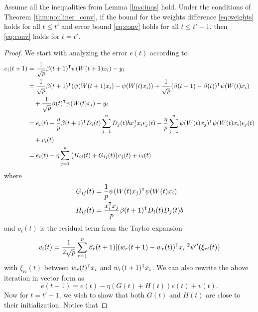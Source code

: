 \begin{lemma}
\label{lma:induction}
Assume all the inequalities from Lemma \ref{lma:inqs} hold. Under the conditions of Theorem \ref{thm:nonliner_conv}, if the bound for the weights difference \eqref{eq:weights} holds for all $t\leq t'$ and error bound \eqref{eq:conv} holds for all $t\leq t'-1$, then \eqref{eq:conv} holds for $t=t'$.
\end{lemma}
\begin{proof}
We start with analyzing the error $e(t)$ according to
\begin{equation*}
\begin{aligned}
    e_i(t+1)
    &= \frac{1}{\sqrt p}\beta(t+1)\transpose\psi(W(t+1)x_i) - y_i \\
    &= \frac{1}{\sqrt p}\beta(t+1)\transpose(\psi(W(t+1)x_i)-\psi(W(t)x_i))+ \frac{1}{\sqrt p}(\beta(t+1)-\beta(t))\transpose \psi(W(t)x_i) \\
    & \quad + \frac{1}{\sqrt p}\beta(t)\transpose \psi(W(t)x_i) - y_i \\
    &=e_i(t) - \frac{\eta}{p}\beta(t+1)\transpose D_i(t)\sum_{j=1}^nD_j(t)b x_j\transpose x_i e_j(t)  - \frac{\eta}{p}\sum_{j=1}^n\psi(W(t)x_j)\transpose\psi(W(t)x_i)e_j(t) \\
    & \quad + v_i(t) \\
    & = e_i(t)-\eta\sum_{j=1}^n\big(H_{ij}(t)+G_{ij}(t)\big)e_j(t) + v_i(t)
\end{aligned}
\end{equation*}
where
\begin{equation*}
\begin{aligned}
G_{ij}(t) &= \frac{1}{p}\psi(W(t)x_j)\transpose\psi(W(t)x_i) \\
H_{ij}(t) &= \frac{x_i\transpose x_j}{p}\beta(t+1)\transpose D_i(t)D_j(t)b
\end{aligned}
\end{equation*}
and $v_i(t)$ is the residual term from the Taylor expansion
\begin{equation*}
    v_i(t) = \frac{1}{2\sqrt p}\sum_{r=1}^p\beta_r(t+1)|(w_r(t+1)-w_r(t))\transpose x_i|^2\psi''(\xi_{ri}(t))
\end{equation*}
with $\xi_{ri}(t)$ between $w_r(t)\transpose x_i$ and $w_r(t+1)\transpose x_i$. We can also rewrite the above iteration in vector form as
\begin{equation}\label{eq:et_iter}
     e(t+1) = e(t) - \eta(G(t)+H(t))e(t) + v(t).
\end{equation}
Now for $t=t'-1$, we wish to show that both $G(t)$ and $H(t)$ are close to their initialization. Notice that

\end{proof}
